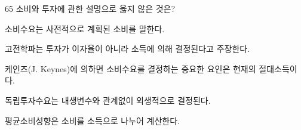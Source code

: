 \begin{question}{65}
소비와 투자에 관한 설명으로 옳지 않은 것은?
\begin{choices}
  \item 소비수요는 사전적으로 계획된 소비를 말한다.
  \item 고전학파는 투자가 이자율이 아니라 소득에 의해 결정된다고 주장한다.
  \item 케인즈(J. Keynes)에 의하면 소비수요를 결정하는 중요한 요인은 현재의 절대소득이다.
  \item 독립투자수요는 내생변수와 관계없이 외생적으로 결정된다.
  \item 평균소비성향은 소비를 소득으로 나누어 계산한다.
\end{choices}
\end{question}

